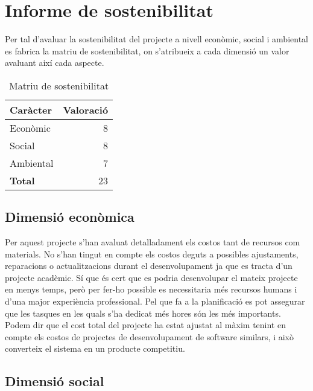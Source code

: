 
\chapter{Informe de sostenibilitat} %

\label{InformeSostenbilitat} %

Per tal d'avaluar la sostenibilitat del projecte a nivell econòmic, social i ambiental es fabrica la matriu de sostenibilitat, on s'atribueix a cada dimensió un
valor avaluant així cada aspecte.\\

\begin{table}[!h]
\centering
\begin{tabular}{|l|r|}
\hline
\textbf{Caràcter} & \textbf{Valoració} \\\hline
Econòmic & 8 \\\hline
Social & 8 \\\hline
Ambiental & 7 \\\hline
\textbf{Total} & 23 \\\hline
\end{tabular}
\label{}
\caption{Matriu de sostenibilitat}
\end{table}

\section{Dimensió econòmica}
Per aquest projecte s'han avaluat detalladament els costos tant de recursos com
materials. No s'han tingut en compte els costos deguts a possibles ajustaments,
reparacions o actualitzacions durant el desenvolupament ja que es tracta d'un
projecte acadèmic. Sí que és cert que es podria desenvolupar el mateix projecte
en menys temps, però per fer-ho possible es necessitaria més recursos humans
i d'una major experiència professional. Pel que fa a la planificació es pot assegurar que les tasques en les quals s'ha dedicat més hores són les més importants.
Podem dir que el cost total del projecte ha estat ajustat al màxim tenint en
compte els costos de projectes de desenvolupament de software similars, i això
converteix el sistema en un producte competitiu.

\section{Dimensió social}

